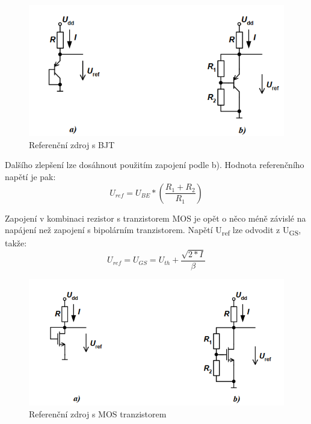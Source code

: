 \begin{figure}[h]
   \begin{center}
     \includegraphics[scale=0.6]{images/ref2.png}
   \end{center}
   \caption{Referenční zdroj s BJT}
\end{figure}
Dalšího zlepšení lze dosáhnout použitím zapojení podle b). Hodnota referenčního napětí je pak:
\begin{equation}
U_{ref} = U_{BE}*(\frac{R_{1}+R_{2}}{R_{1}})
\end{equation}

\pagebreak
Zapojení v kombinaci rezistor s tranzistorem MOS je opět o něco méně závislé na napájení než zapojení s bipolárním tranzistorem. Napětí U\textsubscript{ref} lze odvodit z U\textsubscript{GS}, takže:
\begin{equation}
U_{ref} = U_{GS} = U_{th}+\frac{\sqrt{2*I}}{\beta}
\end{equation}

\begin{figure}[h]
   \begin{center}
     \includegraphics[scale=0.6]{images/ref3.png}
   \end{center}
   \caption{Referenční zdroj s MOS tranzistorem}
\end{figure}

